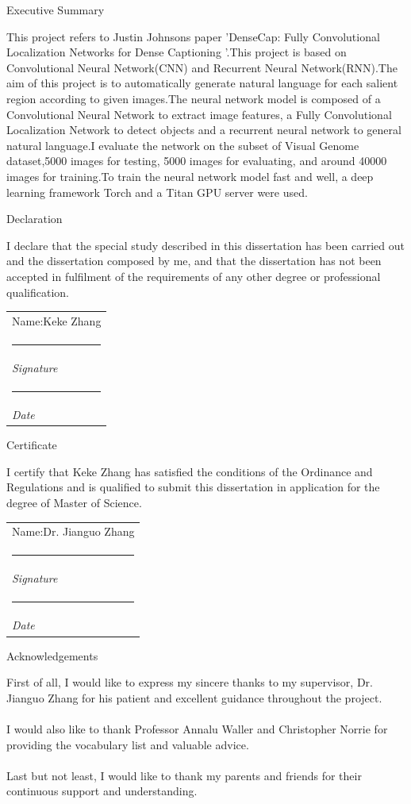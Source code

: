 \documentclass[12pt,a4paper]{report}
\makeatletter
\newcommand{\namesigdate}[2][5cm]{%
  \begin{tabular}{@{}p{#1}@{}}
    #2 \\[2\normalbaselineskip] \hrule \\[0pt]
    {\small \textit{Signature}} \\[2\normalbaselineskip] \hrule \\[0pt]
    {\small \textit{Date}}
  \end{tabular}
}
\makeatother
\begin{document}
\begin{center}
{\huge Executive Summary}
\end{center}
This project refers to Justin Johnson\textsc{}s paper 'DenseCap: Fully Convolutional Localization Networks for Dense Captioning '.This project is based on Convolutional Neural Network(CNN) and Recurrent Neural Network(RNN).The aim of this project is to automatically generate natural language for each salient region according to given images.The neural network model is composed of a Convolutional Neural Network to extract image features, a Fully Convolutional Localization Network to detect objects and a recurrent neural network to general natural language.I evaluate the network on the subset of Visual Genome dataset,5000 images for testing, 5000 images for evaluating, and around 40000 images for training.To train the neural network model fast and well, a deep learning framework  Torch and a Titan GPU server were used.
\newpage


\begin{center}
{\huge Declaration}
\end{center}
I declare that the special study described in this dissertation has been carried out and the dissertation composed by me, and that the dissertation has not been accepted in fulfilment of the requirements of any other degree or professional qualification.\\

\vspace{3cm}

\noindent \namesigdate{Name:Keke Zhang}
\newpage


\begin{center}
{\huge Certificate}
\end{center}
I certify that Keke Zhang has satisfied the conditions of the Ordinance and Regulations and is qualified to submit this dissertation in application for the degree of Master of Science.


\vspace{3cm}

\noindent \namesigdate{Name:Dr. Jianguo Zhang}
\newpage


\begin{center}
{\huge Acknowledgements}
\end{center}
First of all, I would like to express my sincere thanks to my supervisor, Dr. Jianguo Zhang for his patient and excellent guidance throughout the project.\\
\\
I would also like to thank Professor Annalu Waller and Christopher Norrie for providing the vocabulary list and valuable advice.\\
\\
Last but not least, I would like to thank my parents and friends for their continuous support and understanding.
\end{document}
